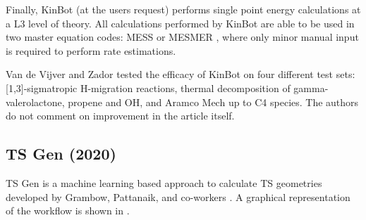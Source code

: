 \documentclass[preprint, 11pt]{elsarticle} %
\begin{document}

Finally, KinBot (at the users request) performs single point energy calculations at a L3 level of theory.
All calculations performed by KinBot are able to be used in two master equation codes: MESS \cite{MESS:2013} or MESMER \cite{MESMER:2012}, where only minor manual input is required to perform rate estimations.

Van de Vijver and Zador tested the efficacy of KinBot on four different test sets: [1,3]-sigmatropic H-migration reactions, thermal decomposition of gamma-valerolactone, propene and OH, and Aramco Mech up to C4 species.
The authors do not comment on improvement in the article itself.


\subsection{TS Gen (2020)}

TS Gen is a machine learning based approach to calculate TS geometries developed by Grambow, Pattanaik, and co-workers \cite{grambow:2020, pattanaik:2020}.
A graphical representation of the workflow is shown in .
\end{document}
